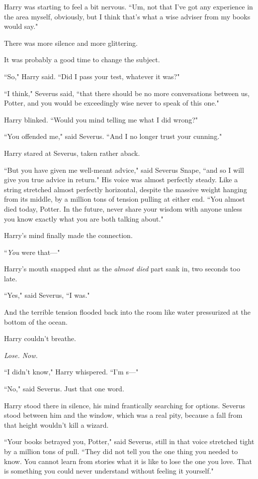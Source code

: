 Harry was starting to feel a bit nervous. ``Um, not that I've got any experience in the area myself, obviously, but I think that's what a wise adviser from my books would say."

There was more silence and more glittering.

It was probably a good time to change the subject.

``So," Harry said. ``Did I pass your test, whatever it was?"

``I think," Severus said, ``that there should be no more conversations between us, Potter, and you would be exceedingly wise never to speak of this one."

Harry blinked. ``Would you mind telling me what I did wrong?"

``You offended me," said Severus. ``And I no longer trust your cunning."

Harry stared at Severus, taken rather aback.

``But you have given me well-meant advice," said Severus Snape, ``and so I will give you true advice in return." His voice was almost perfectly steady. Like a string stretched almost perfectly horizontal, despite the massive weight hanging from its middle, by a million tons of tension pulling at either end. ``You almost died today, Potter. In the future, never share your wisdom with anyone unless you know exactly what you are both talking about."

Harry's mind finally made the connection.

``\emph{You} were that—"

Harry's mouth snapped shut as the \emph{almost died} part sank in, two seconds too late.

``Yes," said Severus, ``I was."

And the terrible tension flooded back into the room like water pressurized at the bottom of the ocean.

Harry couldn't breathe.

\emph{Lose. Now.}

``I didn't know," Harry whispered. ``I'm s—"

``No," said Severus. Just that one word.

Harry stood there in silence, his mind frantically searching for options. Severus stood between him and the window, which was a real pity, because a fall from that height wouldn't kill a wizard.

``Your books betrayed you, Potter," said Severus, still in that voice stretched tight by a million tons of pull. ``They did not tell you the one thing you needed to know. You cannot learn from stories what it is like to lose the one you love. That is something you could never understand without feeling it yourself."

